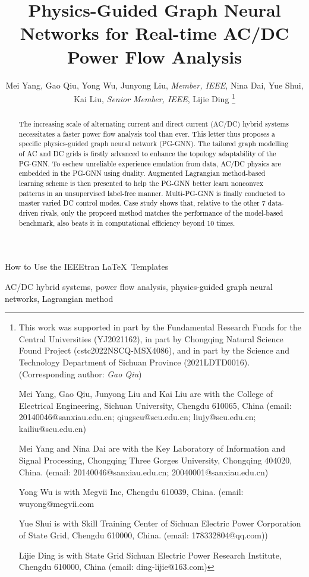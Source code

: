 \documentclass[lettersize,journal]{IEEEtran}
\begin{document}
\title{Physics-Guided Graph Neural Networks for  Real-time AC/DC Power Flow Analysis}
\author{Mei Yang, Gao Qiu, Yong Wu, Junyong Liu, \emph{Member, IEEE}, Nina Dai, Yue Shui, Kai Liu, \emph{Senior Member, IEEE}, Lijie Ding
\vspace{-4ex}
\thanks{This work was supported in part by the Fundamental Research Funds for the Central Universities (YJ2021162), in part by Chongqing Natural Science Found Project (cstc2022NSCQ-MSX4086), and in part by the Science and Technology Department of Sichuan Province (2021LDTD0016). (Corresponding author: \emph{Gao Qiu})

Mei Yang, Gao Qiu, Junyong Liu and Kai Liu are with the College of Electrical Engineering, Sichuan University, Chengdu 610065, China (email: 20140046@sanxiau.edu.cn; qiugscu@scu.edu.cn; liujy@scu.edu.cn; kailiu@scu.edu.cn)

Mei Yang and Nina Dai are with the Key Laboratory of Information and Signal Processing, Chongqing Three Gorges University, Chongqing 404020, China. (email: 20140046@sanxiau.edu.cn; 20040001@sanxiau.edu.cn)

Yong Wu is with Megvii Inc, Chengdu 610039, China. (email: wuyong@megvii.com

Yue Shui is with Skill Training Center of Sichuan Electric Power Corporation of State Grid, Chengdu 610000, China. (email: 178332804@qq.com))

Lijie Ding is with State Grid Sichuan Electric Power Research Institute, Chengdu 610000, China (email: ding-lijie@163.com)
}}

%
{How to Use the IEEEtran \LaTeX \ Templates}
\maketitle
\begin{abstract}
The increasing scale of alternating current and direct current (AC/DC) hybrid systems necessitates a faster power flow analysis tool than ever. This letter thus proposes a specific physics-guided graph neural network (PG-GNN). \textcolor{black} {The tailored graph modelling of AC and DC grids is firstly advanced to enhance the topology adaptability of the PG-GNN}. \textcolor{black} {To eschew unreliable experience emulation from data, AC/DC physics are embedded in the PG-GNN using duality.} \textcolor{black} {Augmented Lagrangian method-based learning scheme is then presented to help the PG-GNN better learn nonconvex patterns in an unsupervised label-free manner. Multi-PG-GNN is finally conducted to master varied DC control modes. Case study shows that, relative to the other 7 data-driven rivals, only the proposed method matches the performance of the model-based benchmark, also beats it in computational efficiency beyond 10 times.} 
\end{abstract}
\begin{IEEEkeywords}
AC/DC hybrid systems, power flow analysis, \textcolor{black}{ physics-guided graph neural networks, Lagrangian method}
\end{IEEEkeywords}
\vspace{-2ex}
\end{document}
